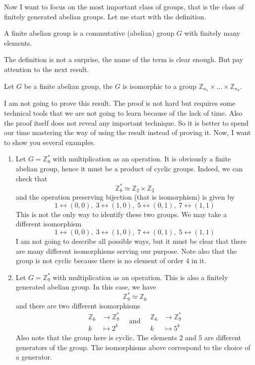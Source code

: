 Now I want to focus on the most important class of groups, that is the class of finitely generated abelian groups.
Let me start with the definition.

\begin{definition}
A finite abelian group is a commutative (abelian) group $G$ with finitely many elements.
\end{definition}

The definition is not a surprise, the name of the term is clear enough.
But pay attention to the next result.

\begin{claim}
Let $G$ be a finite abelian group, the $G$ is isomorphic to a group $\mathbb Z_{n_1}\times \ldots \times \mathbb Z_{n_k}$.
\end{claim}

I am not going to prove this result.
The proof is not hard but requires some technical tools that we are not going to learn because of the lack of time.
Also the proof itself does not reveal any important technique.
So it is better to spend our time mastering the way of using the result instead of proving it.
Now, I want to show you several examples.

\begin{examples}
\begin{enumerate}
\item Let $G = \mathbb Z_8^*$ with multiplication as an operation.
It is obviously a finite abelian group, hence it must be a product of cyclic groups.
Indeed, we can check that
\[
\mathbb Z_8^* \simeq \mathbb Z_2\times \mathbb Z_2
\]
and the operation preserving bijection (that is isomorphism) is given by
\[
1 \leftrightarrow (0,0),\; 3 \leftrightarrow (1,0),\; 5\leftrightarrow(0,1),\;7\leftrightarrow(1,1)
\]
This is not the only way to identify these two groups.
We may take a different isomorphism
\[
1 \leftrightarrow (0,0),\; 3 \leftrightarrow (1,0),\; 7\leftrightarrow(0,1),\;5\leftrightarrow(1,1)
\]
I am not going to describe all possible ways, but it must be clear that there are many different isomorphisms serving our purpose.
Note also that the group is not cyclic because there is no element of order $4$ in it.

\item Let $G = \mathbb Z_9^*$ with multiplication as an operation.
This is also a finitely generated abelian group.
In this case, we have
\[
\mathbb Z_9^* \simeq \mathbb Z_6
\]
and there are two different isomorphisms
\[
\begin{aligned}
\mathbb Z_6 &\to \mathbb Z_9^*\\
k &\mapsto 2^k
\end{aligned}
\quad\text{and}\quad
\begin{aligned}
\mathbb Z_6 &\to \mathbb Z_9^*\\
k &\mapsto 5^k
\end{aligned}
\]
Also note that the group here is cyclic.
The elements $2$ and $5$ are different generators of the group.
The isomorphisms above correspond to the choice of a generator.
\end{enumerate}
\end{examples}


